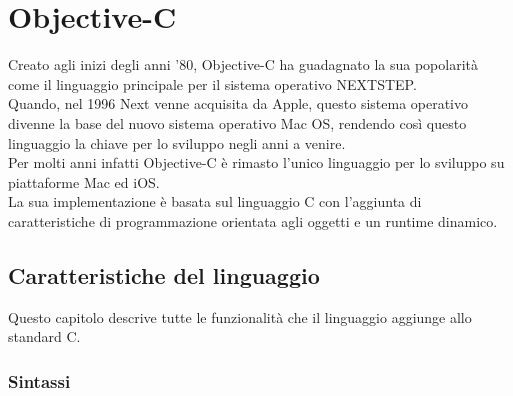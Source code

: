 \chapter{Objective-C}
Creato agli inizi degli anni '80, Objective-C ha guadagnato la sua popolarità come il linguaggio principale per il sistema operativo NEXTSTEP.\\
Quando, nel 1996 Next venne acquisita da Apple, questo sistema operativo divenne la base del nuovo sistema operativo Mac OS, rendendo così questo linguaggio la chiave per lo sviluppo negli anni a venire.\\
Per molti anni infatti Objective-C è rimasto l'unico linguaggio per lo sviluppo su piattaforme Mac ed iOS.\\
La sua implementazione è basata sul linguaggio C con l'aggiunta di caratteristiche di programmazione orientata agli oggetti e un runtime dinamico.
\section{Caratteristiche del linguaggio}
Questo capitolo descrive tutte le funzionalità che il linguaggio aggiunge allo standard C. 
\subsection{Sintassi}
